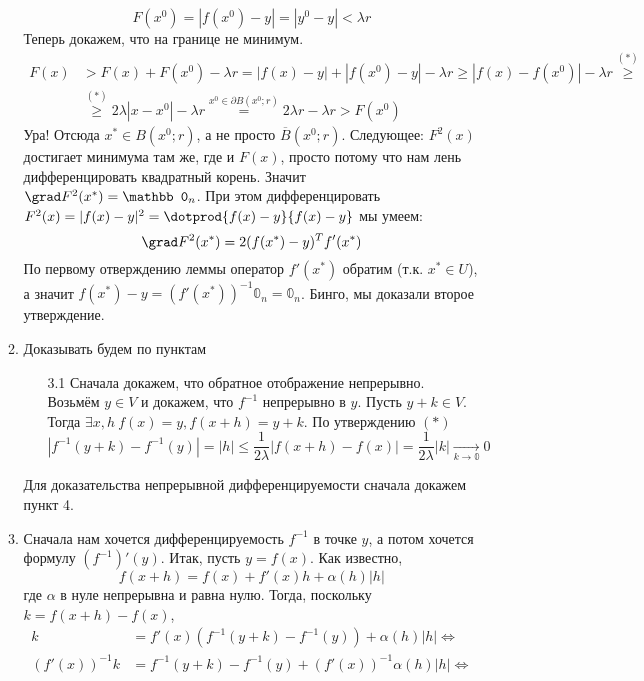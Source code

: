 \documentclass{article}
\begin{document}
\begin{itemize}
\begin{Proof}
\begin{enumerate}
                $$F(x^0)=|f(x^0)-y|=|y^0-y|<\lambda r$$
                Теперь докажем, что на границе не минимум.
                \[\begin{split}
                    F(x)&>F(x)+F(x^0)-\lambda r=|f(x)-y|+|f(x^0)-y|-\lambda r\geqslant|f(x)-f(x^0)|-\lambda r\overset{(*)}\geqslant\\
                    &\overset{(*)}\geqslant2\lambda|x-x^0|-\lambda r\overset{x^0\in\partial B(x^0;r)}=2\lambda r-\lambda r>F(x^0)
                \end{split}\]
                Ура! Отсюда $x^*\in B(x^0;r)$, а не просто $\overline B(x^0;r)$. Следующее: $F^2(x)$ достигает минимума там же, где и $F(x)$, просто потому что нам лень дифференцировать квадратный корень. Значит $\grad F^2(x^*)=\mathbb 0_n$. При этом дифференцировать $F^2(x)=|f(x)-y|^2=\dotprod{f(x)-y}{f(x)-y}$ мы умеем:
                $$
                \grad F^2(x^*)=2(f(x^*)-y)^Tf'(x^*)
                $$
                По первому отверждению леммы оператор $f'(x^*)$ обратим (т.к. $x^*\in U$), а значит $f(x^*)-y=(f'(x^*))^{-1}\mathbb0_n=\mathbb0_n$. Бинго, мы доказали второе утверждение.
                \item Доказывать будем по пунктам
                \begin{enumerate}
                    \item[3.1] Сначала докажем, что обратное отображение непрерывно. Возьмём $y\in V$ и докажем, что $f^{-1}$ непрерывно в $y$. Пусть $y+k\in V$. Тогда $\exists x,h~f(x)=y,f(x+h)=y+k$. По утверждению $(*)$
                    $$
                    |f^{-1}(y+k)-f^{-1}(y)|=|h|\leqslant\frac1{2\lambda}|f(x+h)-f(x)|=\frac1{2\lambda}|k|\underset{k\to\mathbb0}\longrightarrow0
                    $$
                \end{enumerate}
                Для доказательства непрерывной дифференцируемости сначала докажем пункт 4.
                \item Сначала нам хочется дифференцируемость $f^{-1}$ в точке $y$, а потом хочется формулу $(f^{-1})'(y)$. Итак, пусть $y=f(x)$. Как известно,
                $$
                f(x+h)=f(x)+f'(x)h+\alpha(h)|h|
                $$
                где $\alpha$ в нуле непрерывна и равна нулю. Тогда, поскольку $k=f(x+h)-f(x)$,
                \[\begin{split}
                    k&=f'(x)\left(f^{-1}(y+k)-f^{-1}(y)\right)+\alpha(h)|h|\Leftrightarrow\\
                    (f'(x))^{-1}k&=f^{-1}(y+k)-f^{-1}(y)+(f'(x))^{-1}\alpha(h)|h|\Leftrightarrow\\

\end{split}\]
\end{enumerate}
\end{Proof}
\end{itemize}
\end{document}
